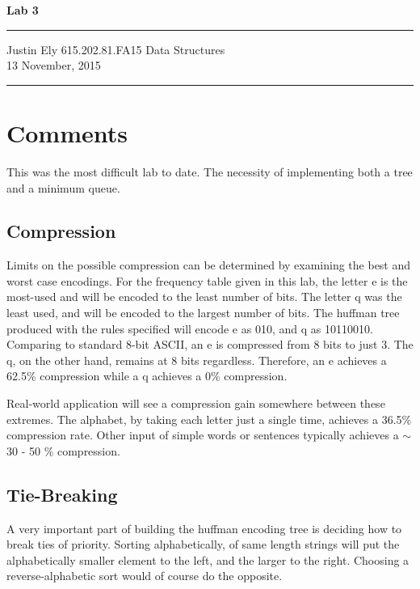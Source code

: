 \documentclass[a4paper,12pt]{article}
\begin{document}
\begin{flushright}

\vspace{1.1cm}

{\bf\Huge Lab 3}

\rule{0.25\linewidth}{0.5pt}

\vspace{0.5cm}
Justin Ely
\linebreak
\newline
\footnotesize{615.202.81.FA15 Data Structures \\}
\vspace{0.5cm}
13 November, 2015
\end{flushright}

\noindent\rule{\linewidth}{1.0pt}


\section{Comments}
This was the most difficult lab to date.  The necessity of implementing both a tree and a minimum queue.


\subsection{Compression}
Limits on the possible compression can be determined by examining the best and worst case encodings.  For the frequency table given in this lab, the letter e is the most-used and will be encoded to the least number of bits.  The letter q was the least used, and will be encoded to the largest number of bits.  The huffman tree produced with the rules specified will encode e as 010, and q as 10110010.  Comparing to standard 8-bit ASCII, an e is compressed from 8 bits to just 3.  The q, on the other hand, remains at 8 bits regardless.  Therefore, an e achieves a 62.5\% compression while a q achieves a 0\% compression.

Real-world application will see a compression gain somewhere between these extremes.  The alphabet, by taking each letter just a single time, achieves a 36.5\% compression rate. Other input of simple words or sentences typically achieves a $\sim$ 30 - 50 \% compression.

\subsection{Tie-Breaking}
A very important part of building the huffman encoding tree is deciding how to break ties of priority.  Sorting alphabetically, of same length strings will put the alphabetically smaller element to the left, and the larger to the right.  Choosing a reverse-alphabetic sort would of course do the opposite.
\end{document}
